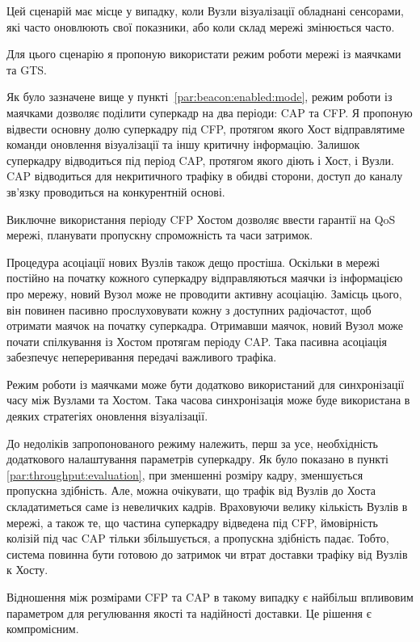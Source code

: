 \documentclass[a4paper,ukrainian,utf8,nocolumnsxix,floatsection]{eskdtext}
\begin{document}
Цей сценарій має місце у випадку, коли Вузли візуалізації обладнані сенсорами, які часто  оновлюють свої показники, або коли склад мережі змінюється часто.

Для цього сценарію я пропоную використати режим роботи мережі із маячками та GTS.

Як було зазначене вище у пункті~\ref{par:beacon:enabled:mode}, режим роботи із маячками дозволяє поділити суперкадр на два періоди: CAP та CFP. Я пропоную відвести основну долю суперкадру під CFP, протягом якого Хост відправлятиме команди оновлення візуалізації та іншу критичну інформацію. Залишок суперкадру відводиться під період CAP, протягом якого діють і Хост, і Вузли. CAP відводиться для некритичного трафіку в обидві сторони, доступ до каналу зв’язку проводиться на конкурентній основі. 

Виключне використання періоду CFP Хостом дозволяє ввести гарантії на QoS мережі, планувати пропускну спроможність та часи затримок. 

Процедура асоціації нових Вузлів також дещо простіша. Оскільки в мережі постійно на початку кожного суперкадру відправляються маячки із інформацією про мережу, новий Вузол може не проводити активну асоціацію. Замісць цього, він повинен пасивно прослуховувати кожну з доступних радіочастот, щоб отримати маячок на початку суперкадра. Отримавши маячок, новий Вузол може почати спілкування із Хостом протягам періоду CAP. Така пасивна асоціація забезпечує непереривання передачі важливого трафіка.

Режим роботи із маячками може бути додатково використаний для синхронізації часу між Вузлами та Хостом. Така часова синхронізація може буде використана в деяких стратегіях оновлення візуалізації.

До недоліків запропонованого режиму належить, перш за усе, необхідність додаткового налаштування параметрів суперкадру. Як було показано в пункті \ref{par:throughput:evaluation}, при зменшенні розміру кадру, зменшується пропускна здібність. Але, можна очікувати, що трафік від Вузлів до Хоста складатиметься саме із невеличких кадрів. Враховуючи велику кількість Вузлів в мережі, а також те, що частина суперкадру відведена під CFP, ймовірність колізій під час CAP тільки збільшується, а пропускна здібність падає. Тобто, система повинна бути готовою до затримок чи втрат доставки трафіку від Вузлів к Хосту. 

Відношення між розмірами CFP та CAP в такому випадку є найбільш впливовим параметром для регулювання якості та надійності доставки. Це рішення є компромісним.
\end{document}
